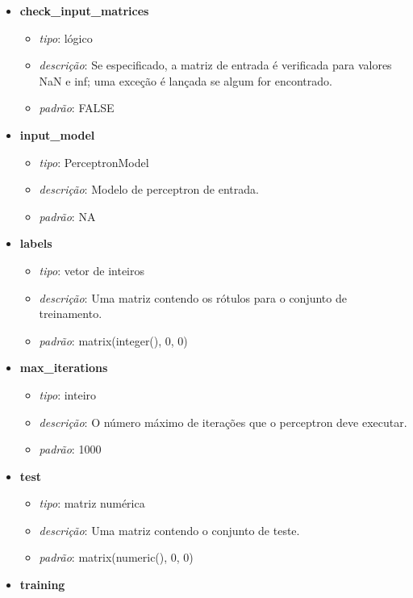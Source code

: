 \documentclass[
  a4paperpaper,
]{article}
\providecommand{\tightlist}{%
  \setlength{\itemsep}{0pt}\setlength{\parskip}{0pt}}\usepackage{longtable,booktabs,array}
\begin{document}
\begin{itemize}
\tightlist
\item
  \textbf{check\_input\_matrices}

  \begin{itemize}
  \tightlist
  \item
    \emph{tipo}: lógico
  \item
    \emph{descrição}: Se especificado, a matriz de entrada é verificada
    para valores NaN e inf; uma exceção é lançada se algum for
    encontrado.
  \item
    \emph{padrão}: FALSE
  \end{itemize}
\item
  \textbf{input\_model}

  \begin{itemize}
  \tightlist
  \item
    \emph{tipo}: PerceptronModel
  \item
    \emph{descrição}: Modelo de perceptron de entrada.
  \item
    \emph{padrão}: NA
  \end{itemize}
\item
  \textbf{labels}

  \begin{itemize}
  \tightlist
  \item
    \emph{tipo}: vetor de inteiros
  \item
    \emph{descrição}: Uma matriz contendo os rótulos para o conjunto de
    treinamento.
  \item
    \emph{padrão}: matrix(integer(), 0, 0)
  \end{itemize}
\item
  \textbf{max\_iterations}

  \begin{itemize}
  \tightlist
  \item
    \emph{tipo}: inteiro
  \item
    \emph{descrição}: O número máximo de iterações que o perceptron deve
    executar.
  \item
    \emph{padrão}: 1000
  \end{itemize}
\item
  \textbf{test}

  \begin{itemize}
  \tightlist
  \item
    \emph{tipo}: matriz numérica
  \item
    \emph{descrição}: Uma matriz contendo o conjunto de teste.
  \item
    \emph{padrão}: matrix(numeric(), 0, 0)
  \end{itemize}
\item
  \textbf{training}


\end{itemize}
\end{document}
